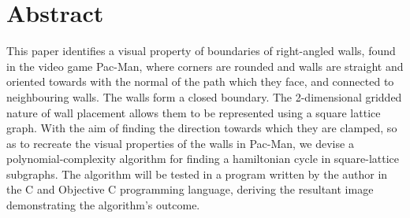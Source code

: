 \section{Abstract}
This paper identifies a visual property of boundaries of right-angled walls, found in the video game Pac-Man, where corners are rounded and walls are straight and oriented towards with the normal of the path which they face, and connected to neighbouring walls. The walls form a closed boundary. The 2-dimensional gridded nature of wall placement allows them to be represented using a square lattice graph. With the aim of finding the direction towards which they are clamped, so as to recreate the visual properties of the walls in Pac-Man, we devise a polynomial-complexity algorithm for finding a hamiltonian cycle in square-lattice subgraphs. The algorithm will be tested in a program written by the author in the C and Objective C programming language, deriving the resultant image demonstrating the algorithm's outcome. 